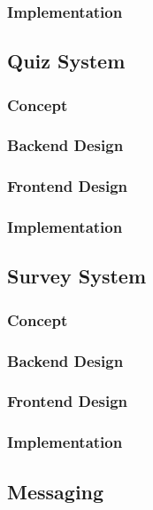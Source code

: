 \subsubsection{Implementation}

\subsection{Quiz System}

\subsubsection{Concept}

\subsubsection{Backend Design}

\subsubsection{Frontend Design}

\subsubsection{Implementation}

\subsection{Survey System}

\subsubsection{Concept}

\subsubsection{Backend Design}

\subsubsection{Frontend Design}

\subsubsection{Implementation}

\subsection{Messaging}


